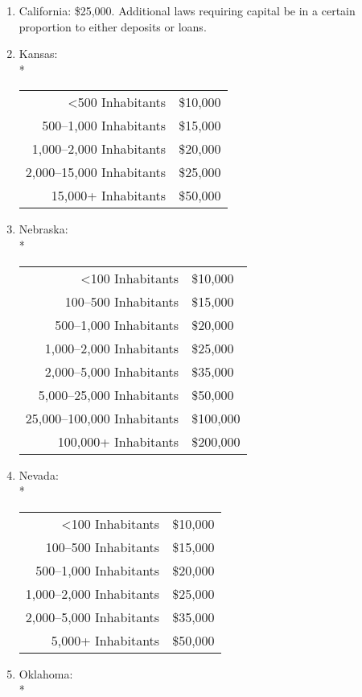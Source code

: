 ﻿\documentclass[12pt]{report}
\begin{document}
    \begin{enumerate}
        \item California: \$25,000. Additional laws requiring capital be in a certain proportion to either deposits or loans.
        \item Kansas:\\*
            \begin{tabular}{r|l}
                <500 Inhabitants & \$10,000\\
                500--1,000 Inhabitants & \$15,000\\
                1,000--2,000 Inhabitants & \$20,000\\
                2,000--15,000 Inhabitants & \$25,000\\
                15,000+ Inhabitants & \$50,000
            \end{tabular}
        \item Nebraska:\\*
            \begin{tabular}{r|l}
                <100 Inhabitants & \$10,000\\
                100--500 Inhabitants & \$15,000\\
                500--1,000 Inhabitants & \$20,000\\
                1,000--2,000 Inhabitants & \$25,000\\
                2,000--5,000 Inhabitants & \$35,000\\
                5,000--25,000 Inhabitants & \$50,000\\
                25,000--100,000 Inhabitants & \$100,000\\
                100,000+ Inhabitants & \$200,000
            \end{tabular}
        \item Nevada:\\*
            \begin{tabular}{r|l}
                <100 Inhabitants & \$10,000\\
                100--500 Inhabitants & \$15,000\\
                500--1,000 Inhabitants & \$20,000\\
                1,000--2,000 Inhabitants & \$25,000\\
                2,000--5,000 Inhabitants & \$35,000\\
                5,000+ Inhabitants & \$50,000
            \end{tabular}
        \item Oklahoma:\\*

\end{enumerate}
\end{document}
